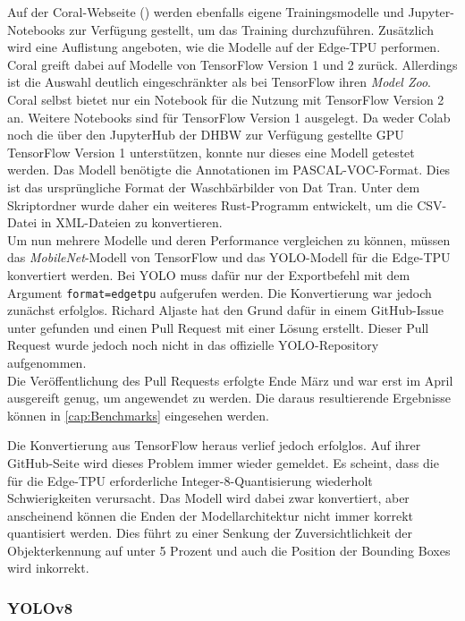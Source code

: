 Auf der Coral-Webseite (\cite{coral_google}) werden ebenfalls eigene Trainingsmodelle und Jupyter-Notebooks zur Verfügung gestellt, um das Training durchzuführen. Zusätzlich wird eine Auflistung angeboten, wie die Modelle auf der Edge-TPU performen.
\\
Coral greift dabei auf Modelle von TensorFlow Version 1 und 2 zurück. Allerdings ist die Auswahl deutlich eingeschränkter als bei TensorFlow ihren \textit{Model Zoo}. Coral selbst bietet nur ein Notebook für die Nutzung mit TensorFlow Version 2 an. Weitere Notebooks sind für TensorFlow Version 1 ausgelegt. Da weder Colab noch die über den JupyterHub der DHBW zur Verfügung gestellte GPU TensorFlow Version 1 unterstützen, konnte nur dieses eine Modell getestet werden. Das Modell benötigte die Annotationen im PASCAL-VOC-Format. Dies ist das ursprüngliche Format der Waschbärbilder von Dat Tran. Unter dem Skriptordner wurde daher ein weiteres Rust-Programm entwickelt, um die CSV-Datei in XML-Dateien zu konvertieren.
\\
Um nun mehrere Modelle und deren Performance vergleichen zu können, müssen das \textit{MobileNet}-Modell von TensorFlow und das \ac{YOLO}-Modell für die Edge-TPU konvertiert werden. Bei \ac{YOLO} muss dafür nur der Exportbefehl mit dem Argument \verb|format=edgetpu| aufgerufen werden. Die Konvertierung war jedoch zunächst erfolglos. Richard Aljaste hat den Grund dafür in einem GitHub-Issue unter \cite{coral_yolo} gefunden und einen Pull Request mit einer Lösung erstellt. Dieser Pull Request wurde jedoch noch nicht in das offizielle \ac{YOLO}-Repository aufgenommen.
\\
Die Veröffentlichung des Pull Requests erfolgte Ende März und war erst im April ausgereift genug, um angewendet zu werden. Die daraus resultierende Ergebnisse können in \ref{cap:Benchmarks} eingesehen werden.

Die Konvertierung aus TensorFlow heraus verlief jedoch erfolglos. Auf ihrer GitHub-Seite wird dieses Problem immer wieder gemeldet. Es scheint, dass die für die Edge-TPU erforderliche Integer-8-Quantisierung wiederholt Schwierigkeiten verursacht. Das Modell wird dabei zwar konvertiert, aber anscheinend können die Enden der Modellarchitektur nicht immer korrekt quantisiert werden. Dies führt zu einer Senkung der Zuversichtlichkeit der Objekterkennung auf unter 5 Prozent und auch die Position der Bounding Boxes wird inkorrekt.

\subsubsection{\ac{YOLO}v8} \label{cap:yolov8}

